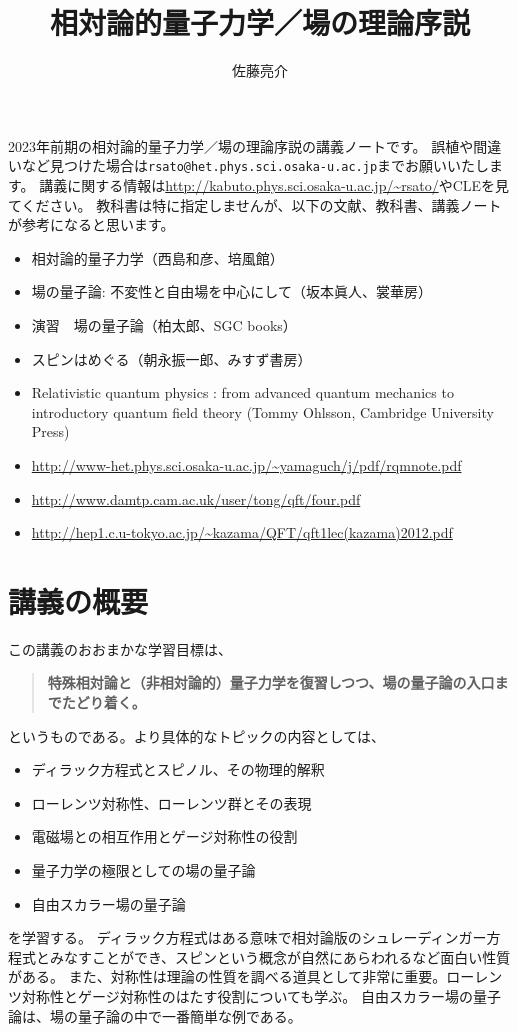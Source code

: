 \documentclass[10pt,a4paper]{jarticle}
\author{佐藤亮介}
\title{相対論的量子力学／場の理論序説}
\begin{document}
\maketitle

2023年前期の相対論的量子力学／場の理論序説の講義ノートです。
誤植や間違いなど見つけた場合は\texttt{rsato@het.phys.sci.osaka-u.ac.jp}までお願いいたします。
講義に関する情報は\url{http://kabuto.phys.sci.osaka-u.ac.jp/~rsato/}やCLEを見てください。
教科書は特に指定しませんが、以下の文献、教科書、講義ノートが参考になると思います。
\begin{itemize}
\item 相対論的量子力学（西島和彦、培風館）
\item 場の量子論: 不変性と自由場を中心にして（坂本眞人、裳華房）
\item 演習　場の量子論（柏太郎、SGC books）
\item スピンはめぐる（朝永振一郎、みすず書房）
\item Relativistic quantum physics : from advanced quantum mechanics to introductory quantum field theory (Tommy Ohlsson, Cambridge University Press)
\item \url{http://www-het.phys.sci.osaka-u.ac.jp/~yamaguch/j/pdf/rqmnote.pdf}
\item \url{http://www.damtp.cam.ac.uk/user/tong/qft/four.pdf}
\item \url{http://hep1.c.u-tokyo.ac.jp/~kazama/QFT/qft1lec(kazama)2012.pdf}
\end{itemize}


\tableofcontents
\setcounter{section}{-1}
\section{講義の概要}
この講義のおおまかな学習目標は、
\begin{quote}
\textbf{特殊相対論と（非相対論的）量子力学を復習しつつ、場の量子論の入口までたどり着く。}
\end{quote}
というものである。より具体的なトピックの内容としては、
\begin{itemize}
\item ディラック方程式とスピノル、その物理的解釈
\item ローレンツ対称性、ローレンツ群とその表現
\item 電磁場との相互作用とゲージ対称性の役割
\item 量子力学の極限としての場の量子論
\item 自由スカラー場の量子論
\end{itemize}
を学習する。
ディラック方程式はある意味で相対論版のシュレーディンガー方程式とみなすことができ、スピンという概念が自然にあらわれるなど面白い性質がある。
また、対称性は理論の性質を調べる道具として非常に重要。ローレンツ対称性とゲージ対称性のはたす役割についても学ぶ。
自由スカラー場の量子論は、場の量子論の中で一番簡単な例である。
\end{document}
